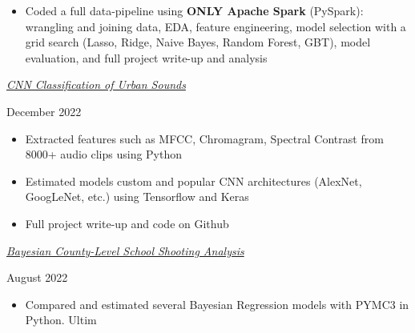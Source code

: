 \documentclass[
  16,
]{article}
\providecommand{\tightlist}{%
  \setlength{\itemsep}{0pt}\setlength{\parskip}{0pt}}\usepackage{longtable,booktabs,array}
\begin{document}
\begin{itemize}
\tightlist
\item
  Coded a full data-pipeline using \textbf{ONLY Apache Spark} (PySpark):
  wrangling and joining data, EDA, feature engineering, model selection
  with a grid search (Lasso, Ridge, Naive Bayes, Random Forest, GBT),
  model evaluation, and full project write-up and analysis
\end{itemize}

\vspace{7pt}

\begin{large}
  \begin{multicols}{2}
    \begin{flushleft}\textit{\href{https://github.com/acbass49/urban_audio_classification}{CNN Classification of Urban Sounds}}\end{flushleft}
    \begin{flushright}December 2022\end{flushright}
  \end{multicols}
  \vspace{-0.17cm}
\end{large}

\begin{itemize}
\tightlist
\item
  Extracted features such as MFCC, Chromagram, Spectral Contrast from
  8000+ audio clips using Python
\item
  Estimated models custom and popular CNN architectures (AlexNet,
  GoogLeNet, etc.) using Tensorflow and Keras
\item
  Full project write-up and code on Github
\end{itemize}

\vspace{7pt}

\begin{large}
  \begin{multicols}{2}
    \begin{flushleft}\textit{\href{https://alexbass.me/posts/bayesian_county/}{Bayesian County-Level School Shooting Analysis}}\end{flushleft}
    \begin{flushright}August 2022\end{flushright}
  \end{multicols}
  \vspace{-0.17cm}
\end{large}

\begin{itemize}
\tightlist
\item
  Compared and estimated several Bayesian Regression models with PYMC3
  in Python. Ultim
\end{itemize}
\end{document}
